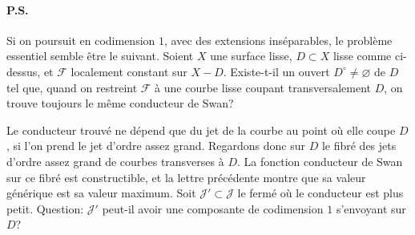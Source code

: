 \documentclass[11pt]{article}
\newcommand{\F}{\mathcal F}
\begin{document}
\paragraph{P.S.}
Si on poursuit en codimension \(1\), avec des extensions inséparables, le problème essentiel semble être le suivant. Soient \(X\) une surface lisse, \(D\subset X\) lisse comme ci-dessus, et \(\F\) localement constant sur \(X-D\). Existe-t-il un ouvert \(D^\circ\ne\varnothing\) de \(D\) tel que, quand on restreint \(\F\) à une courbe lisse coupant transversalement \(D\), on trouve toujours le même conducteur de Swan?

Le conducteur trouvé ne dépend que du jet de la courbe au point où elle coupe \(D\), si l'on prend le jet d'ordre assez grand. Regardons donc sur \(D\) le fibré des jets d'ordre assez grand de courbes transverses à \(D\). La fonction conducteur de Swan sur ce fibré est constructible, et la lettre précédente montre que sa valeur générique est sa valeur maximum. Soit \(\mathcal J'\subset\mathcal J\) le fermé où le conducteur est plus petit. Question: \(\mathcal J'\) peut-il avoir une composante de codimension \(1\) s'envoyant sur \(D\)?
\end{document}

